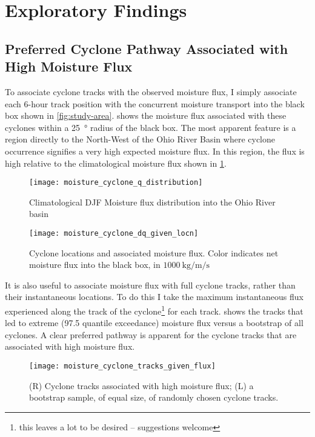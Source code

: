 \documentclass[12pt]{article}
\begin{document}
\section{Exploratory Findings}

\subsection{Preferred Cyclone Pathway Associated with High Moisture Flux}

To associate cyclone tracks with the observed moisture flux, I simply associate each 6-hour track position with the concurrent moisture transport into the black box shown in \cref{fig:study-area}.
 shows the moisture flux associated with these cyclones within a \SI{25}{\degree} radius of the black box.
The most apparent feature is a region directly to the North-West of the Ohio River Basin where cyclone occurrence signifies a very high expected moisture flux.
In this region, the flux is high relative to the climatological moisture flux shown in \cref{fig:flux-distribution}.
\begin{figure}
    \centering
    \texttt{[image: moisture\_cyclone\_q\_distribution]}
    \caption{Climatological DJF Moisture flux distribution into the Ohio River basin}
    \label{fig:flux-distribution}
\end{figure}
\begin{figure}
    \centering
    \texttt{[image: moisture\_cyclone\_dq\_given\_locn]}
    \caption{Cyclone locations and associated moisture flux. Color indicates net moisture flux into the black box, in $\SI{1000}{\kilo\gram\per\meter\per\second}$}
    \label{fig:position-given-flux}
\end{figure}

It is also useful to associate moisture flux with full cyclone tracks, rather than their instantaneous locations.
To do this I take the maximum instantaneous flux experienced along the track of the cyclone\footnote{this leaves a lot to be desired -- suggestions welcome} for each track.
 shows the tracks that led to extreme (97.5 quantile exceedance) moisture flux versus a bootstrap of all cyclones.
A clear preferred pathway is apparent for the cyclone tracks that are associated with high moisture flux.
\begin{figure}
    \centering
    \texttt{[image: moisture\_cyclone\_tracks\_given\_flux]}
    \caption{(R) Cyclone tracks associated with high moisture flux; (L) a bootstrap sample, of equal size, of randomly chosen cyclone tracks.}
    \label{fig:tracks-given-flux}
\end{figure}
\end{document}
